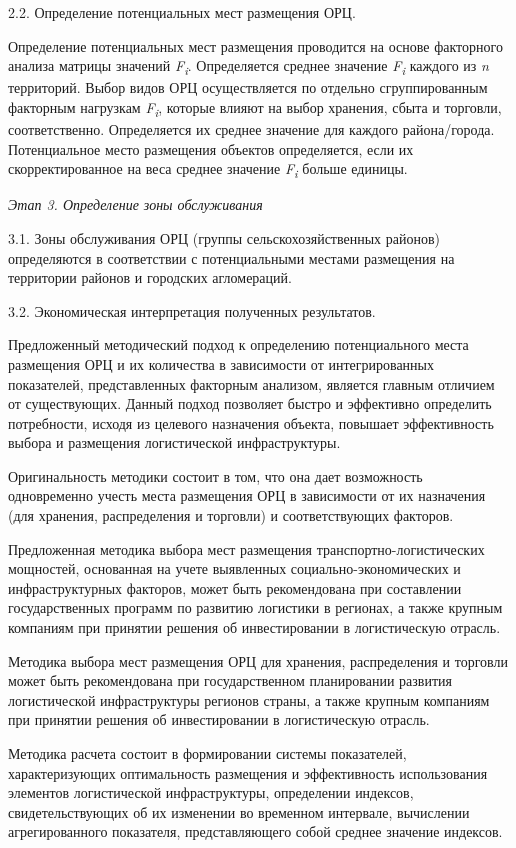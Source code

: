 2.2. Определение потенциальных мест размещения ОРЦ.

Определение потенциальных мест размещения проводится на основе
факторного анализа матрицы значений \emph{F\textsubscript{i}}.
Определяется среднее значение \emph{F\textsubscript{i}} каждого из
\emph{n} территорий. Выбор видов ОРЦ осуществляется по отдельно
сгруппированным факторным нагрузкам \emph{F\textsubscript{i}}, которые
влияют на выбор хранения, сбыта и торговли, соответственно. Определяется
их среднее значение для каждого района/города. Потенциальное место
размещения объектов определяется, если их скорректированное на веса
среднее значение \emph{F\textsubscript{i}} больше единицы.

\emph{Этап 3. Определение зоны обслуживания}

3.1. Зоны обслуживания ОРЦ (группы сельскохозяйственных районов)
определяются в соответствии с потенциальными местами размещения на
территории районов и городских агломераций.

3.2. Экономическая интерпретация полученных результатов.

Предложенный методический подход к определению потенциального места
размещения ОРЦ и их количества в зависимости от интегрированных
показателей, представленных факторным анализом, является главным
отличием от существующих. Данный подход позволяет быстро и эффективно
определить потребности, исходя из целевого назначения объекта, повышает
эффективность выбора и размещения логистической инфраструктуры.

Оригинальность методики состоит в том, что она дает возможность
одновременно учесть места размещения ОРЦ в зависимости от их назначения
(для хранения, распределения и торговли) и соответствующих факторов.

Предложенная методика выбора мест размещения транспортно-логистических
мощностей, основанная на учете выявленных социально-экономических и
инфраструктурных факторов, может быть рекомендована при составлении
государственных программ по развитию логистики в регионах, а также
крупным компаниям при принятии решения об инвестировании в логистическую
отрасль.

Методика выбора мест размещения ОРЦ для хранения, распределения и
торговли может быть рекомендована при государственном планировании
развития логистической инфраструктуры регионов страны, а также крупным
компаниям при принятии решения об инвестировании в логистическую
отрасль.

Методика расчета состоит в формировании системы показателей,
характеризующих оптимальность размещения и эффективность использования
элементов логистической инфраструктуры, определении индексов,
свидетельствующих об их изменении во временном интервале, вычислении
агрегированного показателя, представляющего собой среднее значение
индексов.


